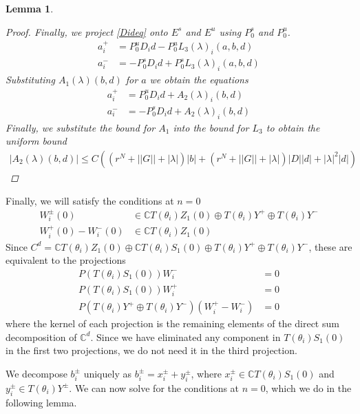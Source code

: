 \documentclass[12pt]{article}
\def\C{{\mathbb C}}
\newtheorem{lemma}{Lemma}
\begin{document}
\begin{lemma}
\begin{proof}
Finally, we project \eqref{Dideq} onto $E^s$ and $E^u$ using $P_0^s$ and $P_0^u$.
\begin{align*}
a_i^+ &= P_0^u D_i d - P_0^u L_3(\lambda)_i(a,b,d) \\
a_i^- &= -P_0^s D_i d + P_0^s L_3(\lambda)_i(a,b,d)
\end{align*}
Substituting $A_1(\lambda)(b,d)$ for $a$ we obtain the equations
\begin{align*}
a_i^+ &= P_0^u D_i d + A_2(\lambda)_i(b,d) \\
a_i^- &= -P_0^s D_i d + A_2(\lambda)_i(b,d)
\end{align*}
Finally, we substitute the bound for $A_1$ into the bound for $L_3$ to obtain the uniform bound
\begin{align*}
|A_2(\lambda)(b,d)| \leq 
C\left( (r^N + ||G|| + |\lambda| )|b| + (r^N + ||G|| + |\lambda|)|D||d| + |\lambda|^2 |d|  \right)
\end{align*}
\end{proof}
\end{lemma}

Finally, we will satisfy the conditions at $n = 0$
\begin{align*}
W_i^\pm(0) &\in \C T(\theta_i) Z_1(0) \oplus T(\theta_i) Y^+ \oplus T(\theta_i) Y^- \\
W_i^+(0) - W_i^-(0) &\in \C T(\theta_i) Z_1(0)
\end{align*}
Since $C^d = \C T(\theta_i) Z_1(0) \oplus \C T(\theta_i) S_1(0) \oplus T(\theta_i) Y^+ \oplus T(\theta_i) Y^-$, these are equivalent to the projections
\begin{equation}\label{projeq}
\begin{aligned}
P(T(\theta_i) S_1(0)) W_i^- &= 0 \\
P(T(\theta_i) S_1(0)) W_i^+ &= 0 \\
P(T(\theta_i) Y^+ \oplus T(\theta_i) Y^-) (W_i^+ - W_i^-) &= 0
\end{aligned}
\end{equation}
where the kernel of each projection is the remaining elements of the direct sum decomposition of $\C^d$. Since we have eliminated any component in $T(\theta_i) S_1(0)$ in the first two projections, we do not need it in the third projection.

We decompose $b_i^\pm$ uniquely as $b_i^\pm = x_i^\pm + y_i^\pm$, where $x_i^\pm \in \C T(\theta_i) S_1(0)$ and $y_i^\pm \in T(\theta_i) Y^\pm$. We can now solve for the conditions at $n = 0$, which we do in the following lemma.
\end{document}
